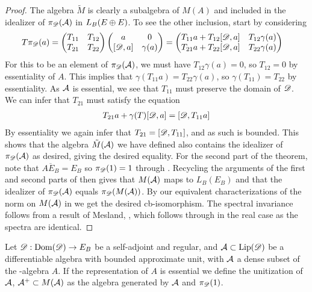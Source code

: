\begin{proof}
	The algebra $\tilde{M}$ is clearly a subalgebra of $M(A)$ and included in the idealizer of $\pi_{\mathscr{D}}(\mathcal{A})$ in $L_B(E\oplus E)$. To see the other inclusion, start by considering
	\begin{align*}
		T\pi_\D(a)&=\begin{pmatrix} T_{11} & T_{12} \\ T_{21} & T_{22} \end{pmatrix} \begin{pmatrix}a & 0 \\ [\D,a] & \gamma(a) \end{pmatrix}
		=\begin{pmatrix} T_{11}a+T_{12}[\D,a] & T_{12}\gamma(a) \\ T_{21}a+T_{22}[\D,a] & T_{22}\gamma(a) \end{pmatrix}
	\end{align*}
	For this to be an element of $\pi_{\mathscr{D}}(\mathcal{A})$, we must have $T_{12}\gamma(a)=0$, so $T_{12}=0$ by essentiality of $A$. This implies that $\gamma(T_{11}a)=T_{22}\gamma(a)$, so $\gamma(T_{11})=T_{22}$ by essentiality. 
	As $\mathcal{A}$ is essential, we see that $T_{11}$ must preserve the domain of $\mathscr{D}$. We can infer that $T_{21}$ must satisfy the equation \begin{align*} T_{21}a+\gamma(T)[\mathscr{D},a]=[\mathscr{D},T_{11}a]\end{align*} By essentiality we again infer that $T_{21}=[\mathscr{D},T_{11}]$, and as such is bounded. This shows that the algebra $\tilde{M}(\mathcal{A})$ we have defined also contains the idealizer of $\pi_{\mathscr{D}}(\mathcal{A})$ as desired, giving the desired equality. 
	\newline
	For the second part of the theorem, note that $\overline{AE_B}=E_B$ so $\pi_{\mathscr{D}}(1)=1$ through . Recycling the arguments of the first and second parts of  then gives that $M(\mathcal{A})$ maps to $L_B(E_B)$ and that the idealizer of $\pi_{\mathscr{D}}(\mathcal{A})$ equals $\pi_{\mathscr{D}}(M(\mathcal{A}))$. By our equivalent characterizations of the norm on $M(\mathcal{A})$ in  we get the desired cb-isomorphism. 
	The spectral invariance follows from a result of Mesland, \cite[Theorem B.3]{mesland}, which follows through in the real case as the spectra are identical. 
\end{proof}
\begin{definition}
	Let $\mathscr{D}:\operatorname{Dom}(\mathscr{D})\to E_B$ be a self-adjoint and regular, and $\mathcal{A}\subset \operatorname{Lip} (\mathscr{D})$ be a differentiable algebra with bounded approximate unit, with $\mathcal{A}$ a dense subset of the \Cstar-algebra $A$. If the representation of $A$ is essential we define the unitization of $\mathcal{A}$, $\mathcal{A}^+ \subset M(\mathcal{A})$ as the algebra generated by $\mathcal{A}$ and $\pi_{\mathscr{D}}(1)$.
\end{definition}
